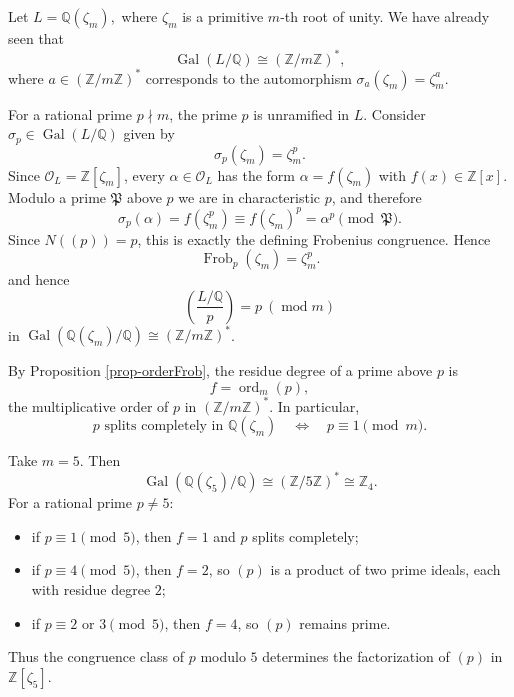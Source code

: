 \begin{example}\label{eg-cyclotomicFrob}
Let
\(L=\mathbb Q(\zeta_m),
\)
where $\zeta_m$ is a primitive $m$-th root of unity. We have already seen that
\[
\operatorname{Gal}(L/\mathbb Q)\cong (\mathbb Z/m\mathbb Z)^*,
\]
where $a\in(\mathbb Z/m\mathbb Z)^*$ corresponds to the automorphism
\(\sigma_a(\zeta_m)=\zeta_m^a.
\)


For a rational prime $p\nmid m$, the prime $p$ is unramified in $L$. Consider
$\sigma_p\in\operatorname{Gal}(L/\mathbb Q)$ given by
\[
\sigma_p(\zeta_m)=\zeta_m^p.
\]
Since $\mathcal O_L=\mathbb Z[\zeta_m]$, every $\alpha\in\mathcal O_L$ has the form
$\alpha=f(\zeta_m)$ with $f(x)\in\mathbb Z[x]$. Modulo a prime $\mathfrak P$ above $p$
we are in characteristic $p$, and therefore
\[
\sigma_p(\alpha)=f(\zeta_m^p)
\equiv f(\zeta_m)^p
=\alpha^p
\pmod{\mathfrak P}.
\]
Since $N((p))=p$, this is exactly the defining Frobenius congruence. Hence
\[
\operatorname{Frob}_p(\zeta_m)=\zeta_m^p.
\]
and hence
\[
\boxed{\left(\frac{L/\mathbb Q}{p}\right)
= p\ (\operatorname{mod} m)}
\]
in $\operatorname{Gal}(\mathbb Q(\zeta_m)/\mathbb Q)
\cong(\mathbb Z/m\mathbb Z)^*$.

By Proposition \ref{prop-orderFrob}, the residue degree of a prime above $p$ is
\[
f=\operatorname{ord}_m(p),
\]
the multiplicative order of $p$ in $(\mathbb Z/m\mathbb Z)^*$. In particular,
\[
p\text{ splits completely in }\mathbb Q(\zeta_m)
\quad\Longleftrightarrow\quad p\equiv 1\pmod m.
\]
\end{example}

\begin{example}
Take $m=5$. Then
\[
\operatorname{Gal}(\mathbb Q(\zeta_5)/\mathbb Q)
\cong (\mathbb Z/5\mathbb Z)^*\cong\mathbb Z_4.
\]
For a rational prime $p\neq 5$:
\begin{itemize}
    \item if $p\equiv1\pmod 5$, then $f=1$ and $p$ splits completely;
    \item if $p\equiv4\pmod 5$, then $f=2$, so $(p)$ is a product of two prime ideals,
    each with residue degree $2$;
    \item if $p\equiv2$ or $3\pmod 5$, then $f=4$, so $(p)$ remains prime.
\end{itemize}
Thus the congruence class of $p$ modulo $5$ determines the factorization of $(p)$ in
$\mathbb Z[\zeta_5]$.
\end{example}


